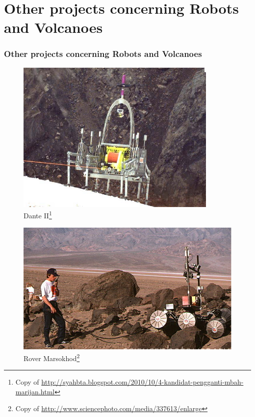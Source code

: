 \documentclass[xcolor=svgnames]{beamer}
\begin{document}
\section{Other projects concerning Robots and Volcanoes}
\begin{frame}
 \frametitle{Other projects concerning Robots and Volcanoes}
    \begin{figure}
      \includegraphics[scale=0.55]{1.png}
	\caption{Dante II\footnote{Copy  of \url{http://syahbta.blogspot.com/2010/10/4-kandidat-pengganti-mbah-marijan.html}}}
    \end{figure}
\end{frame}

\begin{frame}
    \begin{figure}
      \includegraphics[scale=0.40]{2.png}
	\caption{Rover Marsokhod\footnote{Copy  of \url{http://www.sciencephoto.com/media/337613/enlarge}}}
    \end{figure}
\end{frame}
\end{document}
